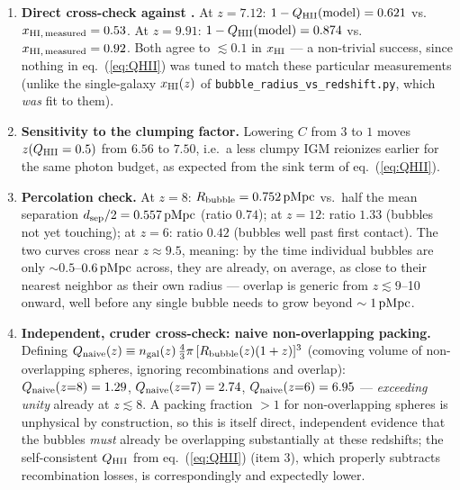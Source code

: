 \documentclass[11pt,a4paper]{article}
\newcommand{\pMpc}{\,{\rm pMpc}}
\begin{document}
\begin{enumerate}
      reionization-history tension recurs here, now derived independently from the galaxy side rather than
      assumed.
\item \textbf{Direct cross-check against \citet{Umeda2023}.} At $z=7.12$: $1-Q_{\rm HII}({\rm model})=0.621$
      vs.\ $x_{\rm HI,\,measured}=0.53$. At $z=9.91$: $1-Q_{\rm HII}({\rm model})=0.874$ vs.\
      $x_{\rm HI,\,measured}=0.92$. Both agree to $\lesssim0.1$ in $x_{\rm HI}$ --- a non-trivial success,
      since nothing in eq.~(\ref{eq:QHII}) was tuned to match these particular measurements (unlike the
      single-galaxy $x_{\rm HI}(z)$ of \texttt{bubble\_radius\_vs\_redshift.py}, which \emph{was} fit to them).
\item \textbf{Sensitivity to the clumping factor.} Lowering $C$ from $3$ to $1$ moves $z(Q_{\rm HII}=0.5)$
      from $6.56$ to $7.50$, i.e.\ a less clumpy IGM reionizes earlier for the same photon budget, as
      expected from the sink term of eq.~(\ref{eq:QHII}).
\item \textbf{Percolation check.} At $z=8$: $R_{\rm bubble}=0.752\pMpc$ vs.\ half the mean separation
      $d_{\rm sep}/2=0.557\pMpc$ (ratio $0.74$); at $z=12$: ratio $1.33$ (bubbles not yet touching); at
      $z=6$: ratio $0.42$ (bubbles well past first contact). The two curves cross near $z\approx9.5$,
      meaning: by the time individual bubbles are only $\sim0.5$--$0.6\pMpc$ across, they are already, on
      average, as close to their nearest neighbor as their own radius --- overlap is generic from
      $z\lesssim9$--10 onward, well before any single bubble needs to grow beyond $\sim1\pMpc$.
\item \textbf{Independent, cruder cross-check: naive non-overlapping packing.} Defining
      $Q_{\rm naive}(z)\equiv n_{\rm gal}(z)\,\tfrac{4}{3}\pi\,[R_{\rm bubble}(z)(1+z)]^3$ (comoving volume of
      non-overlapping spheres, ignoring recombinations and overlap): $Q_{\rm naive}(z{=}8)=1.29$,
      $Q_{\rm naive}(z{=}7)=2.74$, $Q_{\rm naive}(z{=}6)=6.95$ --- \emph{exceeding unity} already at
      $z\lesssim8$. A packing fraction $>1$ for non-overlapping spheres is unphysical by construction, so
      this is itself direct, independent evidence that the bubbles \emph{must} already be overlapping
      substantially at these redshifts; the self-consistent $Q_{\rm HII}$ from eq.~(\ref{eq:QHII}) (item 3),
      which properly subtracts recombination losses, is correspondingly and expectedly lower.
\end{enumerate}

\end{document}
